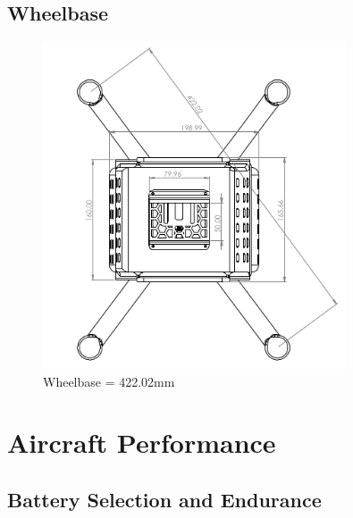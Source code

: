 \documentclass[12pt]{report}
\begin{document}
     
    \subsection*{\centering Wheelbase}
    \begin{figure}[H]
        \centering
        \includegraphics[width=0.8\textwidth]{wheelbase.png}
        \caption{Wheelbase = 422.02mm}
        \label{fig:wheel}
    \end{figure}
      \clearpage

        
    \section{Aircraft Performance}
      \subsection{Battery Selection and Endurance}
\end{document}
